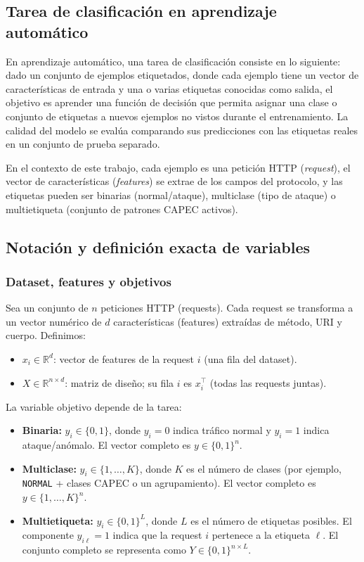 \documentclass[12pt,oneside]{report}
\newcommand{\R}{\mathbb{R}}
\begin{document}
\subsection{Tarea de clasificación en aprendizaje automático}

En aprendizaje automático, una tarea de clasificación consiste en lo siguiente: dado un conjunto de ejemplos etiquetados, donde cada ejemplo tiene un vector de características de entrada y una o varias etiquetas conocidas como salida, el objetivo es aprender una función de decisión que permita asignar una clase o conjunto de etiquetas a nuevos ejemplos no vistos durante el entrenamiento. La calidad del modelo se evalúa comparando sus predicciones con las etiquetas reales en un conjunto de prueba separado.

En el contexto de este trabajo, cada ejemplo es una petición HTTP (\textit{request}), el vector de características (\textit{features}) se extrae de los campos del protocolo, y las etiquetas pueden ser binarias (normal/ataque), multiclase (tipo de ataque) o multietiqueta (conjunto de patrones CAPEC activos).


\subsection{Notación y definición exacta de variables}

\subsubsection{Dataset, features y objetivos}
Sea un conjunto de $n$ peticiones HTTP (requests). Cada request se transforma a un vector numérico de $d$ características (features)
extraídas de método, URI y cuerpo. Definimos:

\begin{itemize}[leftmargin=*]
  \item $x_i \in \R^d$: vector de features de la request $i$ (una fila del dataset).
  \item $X \in \R^{n \times d}$: matriz de diseño; su fila $i$ es $x_i^\top$ (todas las requests juntas).
\end{itemize}

La variable objetivo depende de la tarea:

\begin{itemize}[leftmargin=*]
  \item \textbf{Binaria:} $y_i \in \{0,1\}$, donde $y_i=0$ indica tráfico normal y $y_i=1$ indica ataque/anómalo.
        El vector completo es $y \in \{0,1\}^n$.
  \item \textbf{Multiclase:} $y_i \in \{1,\dots,K\}$, donde $K$ es el número de clases (por ejemplo, \texttt{NORMAL} + clases CAPEC o un agrupamiento).
        El vector completo es $y \in \{1,\dots,K\}^n$.
  \item \textbf{Multietiqueta:} $y_i \in \{0,1\}^L$, donde $L$ es el número de etiquetas posibles.
        El componente $y_{i\ell}=1$ indica que la request $i$ pertenece a la etiqueta $\ell$.
        El conjunto completo se representa como $Y \in \{0,1\}^{n \times L}$.
\end{itemize}
\end{document}
